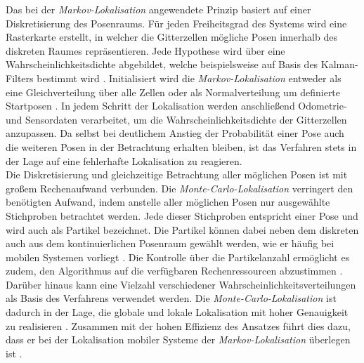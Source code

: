 Das bei der \textit{Markov-Lokalisation} angewendete Prinzip basiert auf einer Diskretisierung des Posenraums. Für jeden Freiheitsgrad des Systems wird eine Rasterkarte erstellt, in welcher die Gitterzellen mögliche Posen innerhalb des diskreten Raumes repräsentieren. Jede Hypothese wird über eine Wahrscheinlichkeitsdichte abgebildet, welche beispielsweise auf Basis des Kalman-Filters bestimmt wird \cite{Hertzberg2012}. Initialisiert wird die \textit{Markov-Lokalisation} entweder als eine Gleichverteilung über alle Zellen oder als Normalverteilung um definierte Startposen \cite{Hertzberg2012}. In jedem Schritt der Lokalisation werden anschließend Odometrie- und Sensordaten verarbeitet, um die Wahrscheinlichkeitsdichte der Gitterzellen anzupassen. Da selbst bei deutlichem Anstieg der Probabilität einer Pose auch die weiteren Posen in der Betrachtung erhalten bleiben, ist das Verfahren stets in der Lage auf eine fehlerhafte Lokalisation zu reagieren.\\


Die Diskretisierung und gleichzeitige Betrachtung aller möglichen Posen ist mit großem Rechenaufwand verbunden. Die \textit{Monte-Carlo-Lokalisation} verringert den benötigten Aufwand, indem anstelle aller möglichen Posen nur ausgewählte Stichproben betrachtet werden. Jede dieser Stichproben entspricht einer Pose und wird auch als Partikel bezeichnet. Die Partikel können dabei neben dem diskreten auch aus dem kontinuierlichen Posenraum gewählt werden, wie er häufig bei mobilen Systemen vorliegt \cite{Fox2001}. Die Kontrolle über die Partikelanzahl ermöglicht es zudem, den Algorithmus auf die verfügbaren Rechenressourcen abzustimmen \cite{Thrun2001}. Darüber hinaus kann eine Vielzahl verschiedener Wahrscheinlichkeitsverteilungen als Basis des Verfahrens verwendet werden. Die \textit{Monte-Carlo-Lokalisation} ist dadurch in der Lage, die globale und lokale Lokalisation mit hoher Genauigkeit zu realisieren \cite{Thrun2005}. Zusammen mit der hohen Effizienz des Ansatzes führt dies dazu, dass er bei der Lokalisation mobiler Systeme der \textit{Markov-Lokalisation} überlegen ist \cite{Fox2001}.


